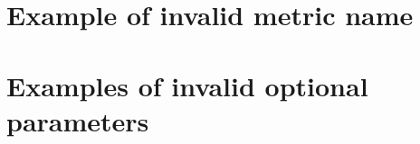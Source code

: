 \documentclass{article}
\begin{document}
\section*{Example of invalid metric name}


\section*{Examples of invalid optional parameters}


\end{document}
